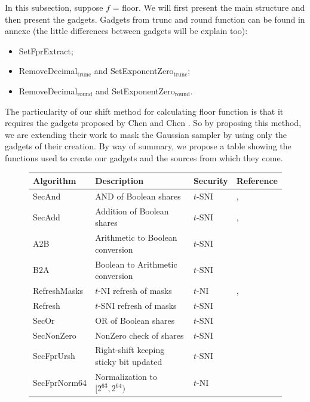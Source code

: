 \documentclass[runningheads]{llncs}
\begin{document}
  In this subsection, suppose $f$ = floor. We will first present the main structure and then present the gadgets. Gadgets from trunc and round function can be found in annexe (the little differences between gadgets will be explain too):
  \begin{itemize}%
      \item SetFprExtract;
      \item RemoveDecimal$_\text{trunc}$ and SetExponentZero$_\text{trunc}$;
      \item RemoveDecimal$_\text{round}$ and SetExponentZero$_\text{round}$.
  \end{itemize}
  The particularity of our shift method for calculating floor function is that it requires the gadgets proposed by Chen and Chen \cite{Chen_Chen_2024}. So by proposing this method, we are extending their work to mask the Gaussian sampler by using only the gadgets of their creation.
  By way of summary, we propose a table showing the functions used to create our gadgets and the sources from which they come.

  \begin{figure}[!ht]
      \begin{center}
          \begin{tabular}{C{2.5 cm} || C{6 cm} C{1.2cm} C{2cm}}
            \toprule
             \textbf{Algorithm} & \textbf{Description} & \textbf{Security} & \textbf{Reference}\\
              \midrule
               SecAnd   & AND of Boolean shares             & $t$-SNI &  \cite{ishai2003private}, \cite{barthe2016strong}\\
               SecAdd         & Addition of Boolean shares        & $t$-SNI&  \cite{coron2015conversion}, \cite{barthe2018masking}\\
               A2B            & Arithmetic to Boolean conversion  & $t$-SNI& \cite{schneider2019efficiently}\\
               B2A            & Boolean to Arithmetic conversion  & $t$-SNI&  \cite{bettale2018improved}\\
               RefreshMasks   & $t$-NI refresh of masks           & $t$-NI&  \cite{barthe2016strong}, \cite{bettale2018improved}\\
               Refresh        & $t$-SNI refresh of masks          & $t$-SNI& \cite{barthe2016strong}\\
               SecOr          & OR of Boolean shares              & $t$-SNI&  \cite{Chen_Chen_2024}\\
               SecNonZero     & NonZero check of shares           & $t$-SNI&  \cite{Chen_Chen_2024}\\
               SecFprUrsh     & Right-shift keeping sticky bit updated  & $t$-SNI&  \cite{Chen_Chen_2024}\\
               SecFprNorm64   & Normalization to $[2^{63},2^{64})$ & $t$-NI& \cite{Chen_Chen_2024}\\
              \bottomrule
          \end{tabular}
      \end{center}
  \end{figure}
\end{document}
